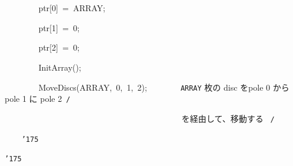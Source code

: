 \documentclass[a4paper,10pt]{article}
\def\mc{\relax}
\begin{document}
\noindent
\mbox{}{\tt\mc \ }{\tt\mc \ }{\tt\mc \ }{\tt\mc \ }{\tt\mc \ }{\tt\mc \ }{\tt\mc \ }{\tt\mc \ }ptr[0]{\tt\mc \ }={\tt\mc \ }ARRAY;

\noindent
\mbox{}{\tt\mc \ }{\tt\mc \ }{\tt\mc \ }{\tt\mc \ }{\tt\mc \ }{\tt\mc \ }{\tt\mc \ }{\tt\mc \ }ptr[1]{\tt\mc \ }={\tt\mc \ }0;

\noindent
\mbox{}{\tt\mc \ }{\tt\mc \ }{\tt\mc \ }{\tt\mc \ }{\tt\mc \ }{\tt\mc \ }{\tt\mc \ }{\tt\mc \ }ptr[2]{\tt\mc \ }={\tt\mc \ }0;

\noindent
\mbox{}\hfill

\noindent
\mbox{}{\tt\mc \ }{\tt\mc \ }{\tt\mc \ }{\tt\mc \ }{\tt\mc \ }{\tt\mc \ }{\tt\mc \ }{\tt\mc \ }InitArray();

\noindent
\mbox{}{\tt\mc \ }{\tt\mc \ }{\tt\mc \ }{\tt\mc \ }{\tt\mc \ }{\tt\mc \ }{\tt\mc \ }{\tt\mc \ }MoveDiscs(ARRAY,{\tt\mc \ }0,{\tt\mc \ }1,{\tt\mc \ }2);{\tt\mc \ }{\tt\mc \ }{\tt\mc \ }{\tt\mc \ }{\tt\mc \ }{\tt\mc \ }\rm\mc {\tt /}{\tt *}\  \ {\tt ARRAY} 枚の disc をpole 0 から pole 1 に pole 2\hfill \rm\mc \ {\tt *}{\tt /}
\tt\mc 

\noindent
\mbox{}{\tt\mc \ }{\tt\mc \ }{\tt\mc \ }{\tt\mc \ }{\tt\mc \ }{\tt\mc \ }{\tt\mc \ }{\tt\mc \ }{\tt\mc \ }{\tt\mc \ }{\tt\mc \ }{\tt\mc \ }{\tt\mc \ }{\tt\mc \ }{\tt\mc \ }{\tt\mc \ }{\tt\mc \ }{\tt\mc \ }{\tt\mc \ }{\tt\mc \ }{\tt\mc \ }{\tt\mc \ }{\tt\mc \ }{\tt\mc \ }{\tt\mc \ }{\tt\mc \ }{\tt\mc \ }{\tt\mc \ }{\tt\mc \ }{\tt\mc \ }{\tt\mc \ }{\tt\mc \ }{\tt\mc \ }{\tt\mc \ }{\tt\mc \ }{\tt\mc \ }{\tt\mc \ }{\tt\mc \ }{\tt\mc \ }{\tt\mc \ }\rm\mc {\tt /}{\tt *}\  \ を経由して、移動する \hfill \rm\mc \ {\tt *}{\tt /}
\tt\mc 

\noindent
\mbox{}{\tt\mc \ }{\tt\mc \ }{\tt\mc \ }{\tt\mc \ }{\tt\char'175}

\noindent
\mbox{}{\tt\char'175}

\rm\mc
\end{document}
